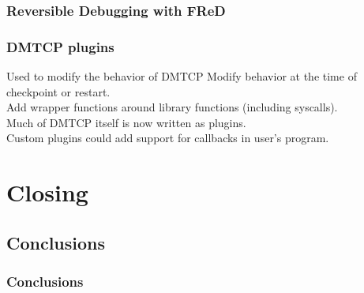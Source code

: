 \documentclass[compress]{beamer}
\begin{document}

\begin{frame}
\frametitle{Reversible Debugging with FReD}




\end{frame}


\begin{frame}
\frametitle{DMTCP plugins}

\begin{block}{Used to modify the behavior of DMTCP}
Modify behavior at the time of checkpoint or restart.\\
\vspace{1ex}
Add wrapper functions around library functions (including syscalls).\\ 
\vspace{1ex}
Much of DMTCP itself is now written as plugins.\\
\vspace{1ex}
Custom plugins could add support for callbacks in user's program.\\
\end{block}

\end{frame}





\section{Closing}             %


\subsection{Conclusions}
\begin{frame}
\frametitle{Conclusions}

\end{frame}
\end{document}
